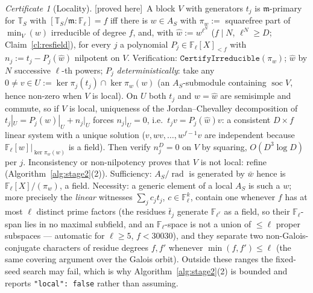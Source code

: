 \documentclass[11pt]{article}
\theoremstyle{remark}
\newtheorem{certificate}[theorem]{Certificate}
\newcommand{\F}{\mathbb{F}}
\newcommand{\Fl}{\F_\ell}
\newcommand{\Flr}{\F_{\ell^r}}
\DeclareMathOperator{\soc}{soc}
\DeclareMathOperator{\rad}{rad}
\newcommand{\T}{\mathbb{T}}
\newcommand{\m}{\mathfrak{m}}
\newcommand{\PROVED}{\textsf{[proved here]}}
\begin{document}
\begin{certificate}[Locality]\label{sec:localcert}\PROVED\
A block $V$ with generators $t_j$ is $\m$-primary for $\T_S$ with $[\T_S/\m:\Fl]=f$ iff there is
$w\in A_S$ with $\pi_w:=$ squarefree part of $\min_V(w)$ irreducible of degree $f$, and, with
$\hat w:=w^{\ell^N}$ ($f\mid N$, $\ell^N\ge D$; Claim~\ref{cl:resfield}), for every $j$ a
polynomial $P_j\in\Fl[X]_{<f}$ with $n_j:=t_j-P_j(\hat w)$ nilpotent on $V$. Verification:
$\mathtt{CertifyIrreducible}(\pi_w)$; $\hat w$ by $N$ successive $\ell$-th powers; $P_j$
\emph{deterministically}: take any $0\ne v\in U:=\ker\pi_j(t_j)\cap\ker\pi_w(w)$ (an
$A_S$-submodule containing $\soc V$, hence non-zero when $V$ is local). On $U$ both $t_j$ and
$w=\hat w$ are semisimple and commute, so if $V$ is local, uniqueness of the Jordan--Chevalley
decomposition of $t_j|_U=P_j(\hat w)|_U+n_j|_U$ forces $n_j|_U=0$, i.e.\ $t_jv=P_j(\hat w)v$: a
consistent $D\times f$ linear system with a unique solution ($v,wv,\dots,w^{f-1}v$ are
independent because $\Fl[w]|_{\ker\pi_w(w)}$ is a field). Then verify $n_j^{D}=0$ on $V$ by
squaring, $O(D^3\log D)$ per $j$. Inconsistency or non-nilpotency proves that $V$ is not local:
refine (Algorithm~\ref{alg:stage2}(2)). Sufficiency: $A_S/\rad$ is generated by $\bar w$ hence
is $\Fl[X]/(\pi_w)$, a field. Necessity: a generic element of a local $A_S$ is such a $w$; more
precisely the \emph{linear} witnesses $\sum_jc_jt_j$, $c\in\Fl^{k}$, contain one whenever $f$ has
at most $\ell$ distinct prime factors (the residues $\bar t_j$ generate $\Flr$ as a field, so
their $\Fl$-span lies in no maximal subfield, and an $\Fl$-space is not a union of $\le\ell$
proper subspaces --- automatic for $\ell\ge5$, $f<30030$), and they separate two
non-Galois-conjugate characters of residue degrees $f,f'$ whenever $\min(f,f')\le\ell$ (the
same covering argument over the Galois orbit). Outside these ranges the fixed-seed search may
fail, which is why Algorithm~\ref{alg:stage2}(2) is bounded and reports \texttt{"local": false}
rather than assuming.


\end{certificate}
\end{document}
